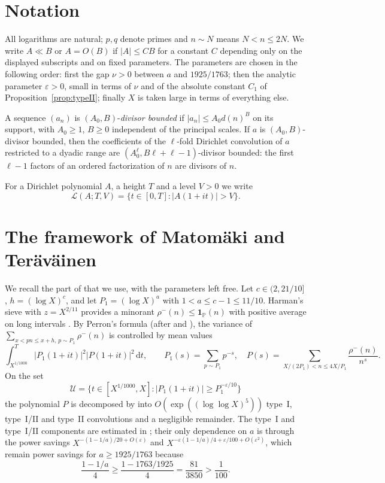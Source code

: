 \documentclass[11pt,a4paper]{amsart}
\theoremstyle{definition}
\newcommand{\e}{\varepsilon}
\newcommand{\dd}{\,\mathrm d}
\newcommand{\1}{\mathbf 1}
\newcommand{\cU}{\mathcal U}
\begin{document}
\section{Notation}\label{sec:notation}

All logarithms are natural; \(p,q\) denote primes and \(n\sim N\) means
\(N<n\le2N\).  We write \(A\ll B\) or \(A=O(B)\) if \(|A|\le CB\) for a
constant \(C\) depending only on the displayed subscripts and on fixed
parameters.  The parameters are chosen in the following order: first the
gap \(\nu>0\) between \(a\) and \(1925/1763\); then the analytic
parameter \(\e>0\), small in terms of \(\nu\) and of the absolute
constant \(C_1\) of Proposition~\ref{prop:typeII}; finally \(X\) is
taken large in terms of everything else.

A sequence \((a_n)\) is \((A_0,B)\)-\emph{divisor bounded} if
\(|a_n|\le A_0d(n)^B\) on its support, with \(A_0\ge1\), \(B\ge0\)
independent of the principal scales.  If \(a\) is \((A_0,B)\)-divisor
bounded, then the coefficients of the \(\ell\)-fold Dirichlet
convolution of \(a\) restricted to a dyadic range are
\((A_0^\ell,B\ell+\ell-1)\)-divisor bounded: the first \(\ell-1\)
factors of an ordered factorization of \(n\) are divisors of \(n\).

For a Dirichlet polynomial \(A\), a height \(T\) and a level \(V>0\) we
write
\[
 \mathcal L(A;T,V)=\{t\in[0,T]:|A(1+it)|>V\}.
\]

\section{The framework of Matom\"aki and Ter\"av\"ainen}
\label{sec:framework}

We recall the part of \cite{MT} that we use, with the parameters left
free.  Let \(c\in(2,21/10]\), \(h=(\log X)^c\), and let
\(P_1=(\log X)^a\) with \(1<a\le c-1\le 11/10\).  Harman's sieve with
\(z=X^{2/11}\) provides a minorant \(\rho^-(n)\le\1_{\mathbb P}(n)\)
\cite[(2.3)]{MT} with positive average on long intervals
\cite[Theorem~2.1(ii)]{MT}.  By Perron's formula
\cite[Lemma~3.1]{MT} (after \cite[Lemma~14]{MR} and \cite[Lemma~1]{Ter}),
the variance of \(\sum_{x<pn\le x+h,\,p\sim P_1}\rho^-(n)\) is controlled
by mean values
\[
 \int_{X^{1/1000}}^{T}|P_1(1+it)|^2|P(1+it)|^2\dd t,\qquad
 P_1(s)=\sum_{p\sim P_1}p^{-s},\quad
 P(s)=\sum_{X/(2P_1)<n\le4X/P_1}\frac{\rho^-(n)}{n^s}.
\]
On the set
\begin{equation}\label{eq:Udef}
 \cU=\bigl\{t\in[X^{1/1000},X]:|P_1(1+it)|\ge P_1^{-\e/10}\bigr\}
\end{equation}
the polynomial \(P\) is decomposed by \cite[Proposition~2.2]{MT} into
\(O(\exp((\log\log X)^5))\) type~I, type~I/II and type~II convolutions
and a negligible remainder.  The type~I and type~I/II components are
estimated in \cite[Sections~5.1--5.2]{MT}; their only dependence on
\(a\) is through the power savings
\(X^{-(1-1/a)/20+O(\e)}\) and \(X^{-\e(1-1/a)/4+\e/100+O(\e^2)}\), which
remain power savings for \(a\ge1925/1763\) because
\[
 \frac{1-1/a}{4}\ge\frac{1-1763/1925}{4}=\frac{81}{3850}>\frac1{100}.
\]
\end{document}
